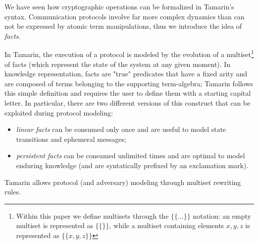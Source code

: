 \documentclass{article}
\newcounter{definition}[section]\setcounter{definition}{0}
\begin{document}
We have seen how cryptographic operations can be formalized in Tamarin's syntax. Communication protocols involve far more complex dynamics than can not be expressed by atomic term manipulations, thus we introduce the idea of \textit{facts}.

In Tamarin, the execution of a protocol is modeled by the evolution of a multiset\footnote{Within this paper we define multisets through the $\{\{ ... \}\}$ notation: an empty multiset is represented as $\{\{\}\}$, while a multiset containing elements $x,y,z$ is represented as $\{\{x,y,z\}\}$} of facts (which represent the state of the system at any given moment). In knowledge representation, facts are "true" predicates that have a fixed arity and are composed of terms belonging to the supporting term-algebra; Tamarin follows this simple definition and requires the user to define them with a starting capital letter. In particular, there are two different versions of this construct that can be exploited during protocol modeling:

\begin{itemize}
    \item \textit{linear facts} can be consumed only once and are useful to model state transitions and ephemeral messages;
    \item \textit{persistent facts} can be consumed unlimited times and are optimal to model enduring knowledge (and are syntatically prefixed by an exclamation mark).
\end{itemize}

Tamarin allows protocol (and adversary) modeling through multiset rewriting rules.
\end{document}
